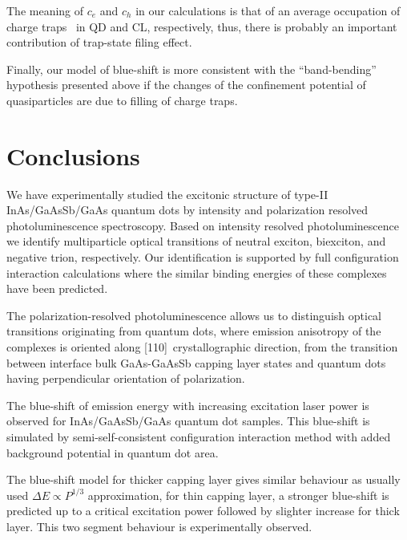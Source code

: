 The meaning of $c_e$ and $c_h$ in our calculations is that of an average occupation of charge traps~\cite{Reimer2016} in QD and CL, respectively, thus, there is probably an important contribution of trap-state filing effect. 

Finally, our model of blue-shift is more consistent with the ``band-bending'' hypothesis presented above if the changes of the confinement potential of quasiparticles are due to filling of charge traps.

\section*{Conclusions}
We have experimentally studied the excitonic structure of type-II InAs/GaAsSb/GaAs quantum dots by intensity and polarization resolved photoluminescence spectroscopy. Based on intensity resolved photoluminescence we identify multiparticle optical transitions of neutral exciton, biexciton, and negative trion, respectively. Our identification is supported by full configuration interaction calculations where the similar binding energies of these complexes have been predicted. 

The polarization-resolved photoluminescence allows us to distinguish optical transitions originating from quantum dots, where emission anisotropy of the complexes is oriented along [110]~crystallographic direction, from the transition between interface bulk GaAs-GaAsSb capping layer states and quantum dots having perpendicular orientation of polarization.

The blue-shift of emission energy with increasing excitation laser power is observed for InAs/GaAsSb/GaAs quantum dot samples. This blue-shift is simulated by semi-self-consistent configuration interaction method with added background potential in quantum dot area.

The blue-shift model for thicker capping layer gives similar behaviour as usually used $\Delta E\propto P^{1/3}$ approximation, for thin capping layer, a stronger blue-shift is predicted up to a critical excitation power followed by slighter increase for thick layer. This two segment behaviour is experimentally observed.
\newpage